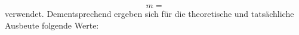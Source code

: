   \begin{equation*}
    m = 
  \end{equation*}
  verwendet. Dementsprechend ergeben sich für die theoretische und tatsächliche Ausbeute folgende Werte:
  
  \begin{center}
  \end{center}

